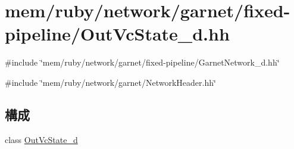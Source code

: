 \hypertarget{OutVcState__d_8hh}{
\section{mem/ruby/network/garnet/fixed-\/pipeline/OutVcState\_\-d.hh}
\label{OutVcState__d_8hh}
}
{\ttfamily \#include \char`\"{}mem/ruby/network/garnet/fixed-\/pipeline/GarnetNetwork\_\-d.hh\char`\"{}}\par
{\ttfamily \#include \char`\"{}mem/ruby/network/garnet/NetworkHeader.hh\char`\"{}}\par
\subsection*{構成}
\begin{DoxyCompactItemize}
\item 
class \hyperlink{classOutVcState__d}{OutVcState\_\-d}
\end{DoxyCompactItemize}
